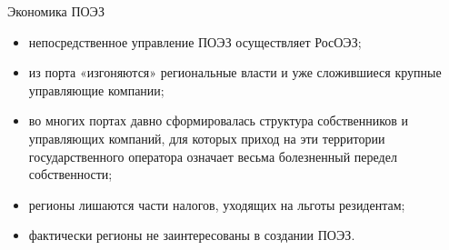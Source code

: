 \documentclass[_Venture_p3.tex]{subfiles}
\begin{document}
 

\begin{frame}[allowframebreaks]{Экономика ПОЭЗ}{}
\begin{itemize}
	\item непосредственное управление ПОЭЗ осуществляет РосОЭЗ;
	\item из порта «изгоняются» региональные власти и уже сложившиеся крупные управляющие компании; 
	\item во многих портах давно сформировалась структура собственников и управляющих компаний, для которых приход на эти территории государственного оператора означает весьма болезненный передел собственности; 
	
	\pagebreak
	\item регионы лишаются части налогов, уходящих на льготы резидентам;
	\item фактически регионы не заинтересованы в создании ПОЭЗ.
\end{itemize}
\end{frame}
\end{document}
